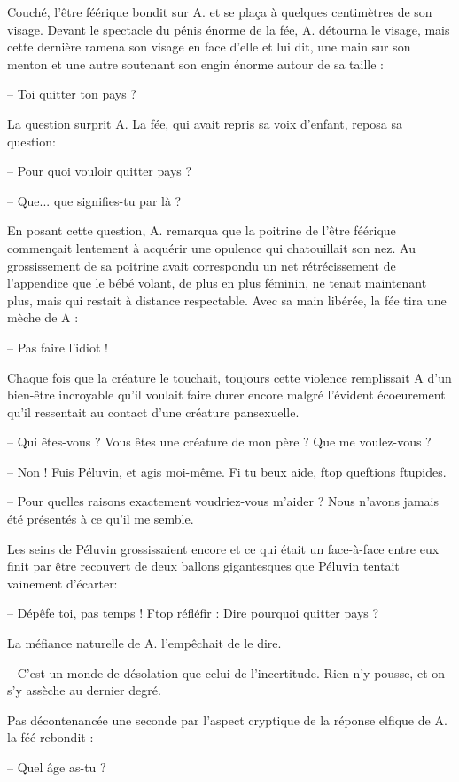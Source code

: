 Couché, l'être féérique bondit sur A. et se plaça à quelques
centimètres de son visage. Devant le spectacle du pénis énorme de la
fée, A. détourna le visage, mais cette dernière ramena son visage en
face d'elle et lui dit, une main sur son menton et une autre soutenant
son engin énorme autour de sa taille :

-- Toi quitter ton pays ?

La question surprit A. La fée, qui avait repris sa voix d'enfant,
reposa sa question:

-- Pour quoi vouloir quitter pays ?

-- Que... que signifies-tu par là ?

En posant cette question, A. remarqua que la poitrine de l'être
féérique commençait lentement à acquérir une opulence qui chatouillait
son nez. Au grossissement de sa poitrine avait correspondu un net
rétrécissement de l'appendice que le bébé volant, de plus en plus
féminin, ne tenait maintenant plus, mais qui restait à distance
respectable. Avec sa main libérée, la fée tira une mèche de A :

-- Pas faire l'idiot !

Chaque fois que la créature le touchait, toujours cette violence
remplissait A d'un bien-être incroyable qu'il voulait faire durer
encore malgré l'évident écoeurement qu'il ressentait au contact d'une
créature pansexuelle.

-- Qui êtes-vous ? Vous êtes une créature de mon père ? Que me voulez-vous ?

-- Non ! Fuis Péluvin, et agis moi-même. Fi tu beux aide, ftop
   queftions ftupides.

-- Pour quelles raisons exactement voudriez-vous m'aider ? Nous
   n'avons jamais été présentés à ce qu'il me semble.

Les seins de Péluvin grossissaient encore et ce qui était un
face-à-face entre eux finit par être recouvert de deux ballons
gigantesques que Péluvin tentait vainement d'écarter:

-- Dépêfe toi, pas temps ! Ftop réfléfir : Dire pourquoi
   quitter pays ?

La méfiance naturelle de A. l'empêchait de le dire.

-- C'est un monde de désolation que celui de l'incertitude. Rien
   n'y pousse, et on s'y assèche au dernier degré.

Pas décontenancée une seconde par l'aspect cryptique de la réponse
elfique de A. la féé rebondit :

-- Quel âge as-tu ?

